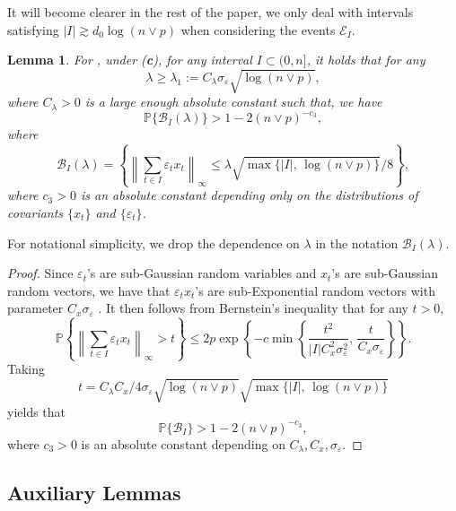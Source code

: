 \documentclass[twoside]{article}
\newtheorem{lemma}[theorem]{Lemma}
\begin{document}
It will become clearer in the rest of the paper, we only deal with intervals satisfying $|I| \gtrsim d_0\log(n \vee p)$ when considering the events $\mathcal{E}_I$.

\begin{lemma}\label{lem-x-bound}
For , under (\textbf{c}), for any interval $I \subset (0, n]$, it holds that for any 
	\[
		\lambda \geq \lambda_1 := C_{\lambda}\sigma_{\varepsilon} \sqrt{\log(n \vee p)},
	\]
	where $C_{\lambda} > 0$ is a large enough absolute constant such that, we have
	\[
		\mathbb{P}\{\mathcal{B}_I(\lambda)\} > 1 - 2(n \vee p)^{-c_3},
	\]	
	where
	\[
		\mathcal{B}_I(\lambda) = \left\{\left\|\sum_{t \in I} \varepsilon_t x_t \right\|_{\infty} \leq \lambda \sqrt{\max\{|I|, \, \log(n \vee p)\}}/8 \right\},
	\]
	where $c_3 > 0$ is an absolute constant depending only on the distributions of covariants $\{x_t\}$ and $\{\varepsilon_t\}$.
\end{lemma}

For notational simplicity, we drop the dependence on $\lambda$ in the notation $\mathcal{B}_I(\lambda)$.

\begin{proof}
	Since $\varepsilon_t$'s are sub-Gaussian random variables and $x_t$'s are sub-Gaussian random vectors, we have that $\varepsilon_t x_t$'s are sub-Exponential random vectors with parameter $C_x \sigma_{\varepsilon}$ \citep[see e.g.~Lemma~2.7.7 in][]{vershynin2018high}.  It then follows from Bernstein's inequality \citep[see e.g.~Theorem~2.8.1 in][]{vershynin2018high} that for any $t > 0$,
		\[
			\mathbb{P}\left\{\left\|\sum_{t \in I} \varepsilon_t x_t \right\|_{\infty} > t\right\} \leq 2p \exp\left\{-c \min\left\{\frac{t^2}{|I|C_x^2\sigma^2_{\varepsilon}}, \, \frac{t}{C_x \sigma_{\varepsilon}}\right\}\right\}.
		\]
		Taking 
		\[
			t = C_{\lambda}C_x/4 \sigma_{\varepsilon} \sqrt{\log(n \vee p)} \sqrt{\max\{|I|, \, \log(n \vee p)\}}
		\] 
		yields that 
		\[
			\mathbb{P}\{\mathcal{B}_I\} > 1 - 2(n \vee p)^{-c_3},
		\]
		where $c_3 > 0$ is an absolute constant depending on $C_{\lambda}, C_x, \sigma_{\varepsilon}$.
\end{proof}

\subsection{Auxiliary Lemmas}
\end{document}
